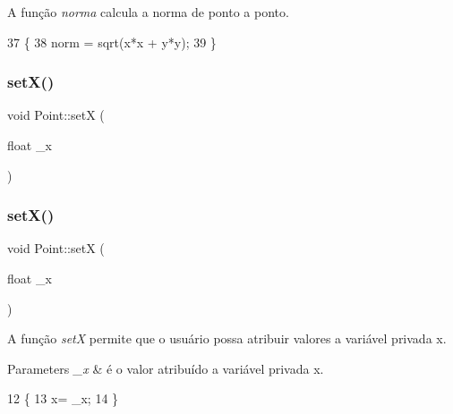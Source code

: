 A função {\itshape norma} calcula a norma de ponto a ponto. 


\begin{DoxyCode}
37                  \{
38        norm = sqrt(x*x + y*y);
39 \}
\end{DoxyCode}
\mbox{\label{class_point_a428a1676e2fdec6753c42011a1d59d18}} 
\subsubsection{\texorpdfstring{set\+X()}{setX()}\hspace{0.1cm}{\footnotesize\ttfamily [1/2]}}
{\footnotesize\ttfamily void Point\+::setX (\begin{DoxyParamCaption}\item[{float}]{\+\_\+x }\end{DoxyParamCaption})}

\mbox{\label{class_point_a428a1676e2fdec6753c42011a1d59d18}} 
\subsubsection{\texorpdfstring{set\+X()}{setX()}\hspace{0.1cm}{\footnotesize\ttfamily [2/2]}}
{\footnotesize\ttfamily void Point\+::setX (\begin{DoxyParamCaption}\item[{float}]{\+\_\+x }\end{DoxyParamCaption})}



A função {\itshape setX} permite que o usuário possa atribuir valores a variável privada x. 


\begin{DoxyParams}{Parameters}
{\em \+\_\+x} & é o valor atribuído a variável privada x. \\
\hline
\end{DoxyParams}

\begin{DoxyCode}
12                         \{
13     x= \_x;
14 \}
\end{DoxyCode}
\mbox{\label{class_point_ab5385c6d9bfa841e641e4709fc9f14cc}} 
